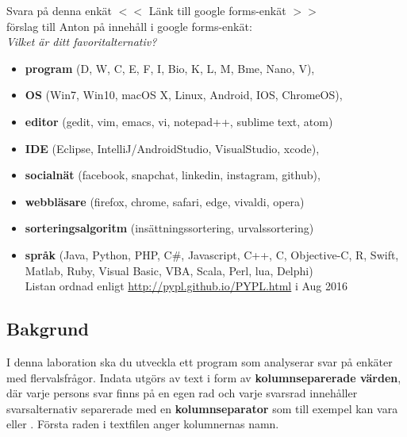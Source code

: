 \begin{Preparations}
\item {}
\item {}
\item \ReadTheLab
\item Svara på denna enkät $<<$ \TODO Länk till google forms-enkät $>>$  \\
\TODO förslag till Anton på innehåll i google forms-enkät:\\ \textit{Vilket är ditt favoritalternativ?}
\begin{itemize}[nolistsep,noitemsep]
\item \textbf{program} (D, W, C, E, F, I, Bio, K, L, M, Bme, Nano, V), 
\item \textbf{OS} (Win7, Win10, macOS X, Linux, Android, IOS, ChromeOS), 
\item \textbf{editor} (gedit, vim, emacs, vi, notepad++, sublime text, atom)
\item \textbf{IDE} (Eclipse, IntelliJ/AndroidStudio, VisualStudio, xcode), 
\item \textbf{socialnät} (facebook, snapchat, linkedin, instagram, github), 
\item \textbf{webbläsare} (firefox, chrome, safari, edge, vivaldi, opera)
\item \textbf{sorteringsalgoritm} (insättningssortering, urvalssortering)
\item \textbf{språk} (Java, Python, PHP, C\#, Javascript, C++, C, Objective-C, R, Swift, Matlab, Ruby, Visual Basic, VBA, Scala, Perl, lua, Delphi)  \\
Listan ordnad enligt \url{http://pypl.github.io/PYPL.html} i Aug 2016
\end{itemize}
\end{Preparations}


\subsection{Bakgrund}

I denna laboration ska du utveckla ett program som analyserar svar på enkäter med flervalsfrågor. Indata utgörs av text i form av \textbf{kolumnseparerade värden}, där varje persons svar finns på en egen rad och varje svarsrad innehåller svarsalternativ separerade med en \textbf{kolumnseparator} som till exempel kan vara \code{;} eller \code{\t}. Första raden i textfilen anger kolumnernas namn.

